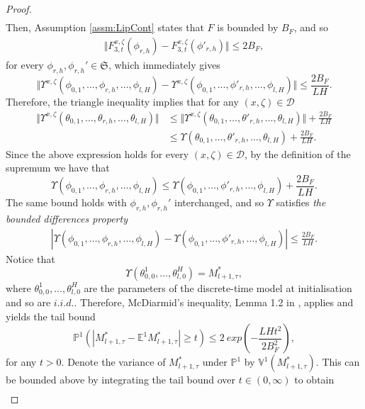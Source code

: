 \documentclass{article}
\begin{document}
\begin{appendices}
\begin{proof}
\begin{align*}
\end{align*}
 Then, Assumption \ref{assm:LipCont} states that $F$ is bounded by $B_F$, and so
\begin{align*}
     \Vert F_{3,t}^{x,\zeta}(\phi_{r,h})-F_{3,t}^{x,\zeta}(\phi'_{r,h}) \Vert\le 2B_F,
\end{align*}
 for every $\phi_{r,h},\phi_{r,h}'\in \mathfrak{S}$,
which immediately gives
\[
\Vert\Upsilon^{x,\zeta}(\phi_{0,1},\ldots,\phi_{r,h},\ldots, \phi_{l,H}) -\Upsilon^{x,\zeta}(\phi_{0,1},\ldots,\phi'_{r,h},\ldots, \phi_{l,H})\Vert \le \frac{2B_F}{LH}
.\]
Therefore, the triangle inequality implies that for any $(x,\zeta)\in \mathscr D$
\begin{align*}
    \Vert \Upsilon^{x,\zeta}(\theta_{0,1},\ldots,\theta_{r,h},\ldots, \theta_{l,H})\Vert &\le \Vert \Upsilon^{x,\zeta}(\theta_{0,1},\ldots,\theta'_{r,h},\ldots, \theta_{l,H})\Vert+ \frac{2B_F}{LH}\\
    &\le \Upsilon(\theta_{0,1},\ldots,\theta'_{r,h},\ldots, \theta_{l,H})+ \frac{2B_F}{LH}.
\end{align*}
 Since the above expression holds for every $(x,\zeta)\in \mathscr D$, by the definition of the supremum we have that
\[
\Upsilon(\phi_{0,1},\ldots,\phi_{r,h},\ldots, \phi_{l,H}) \le  \Upsilon(\phi_{0,1},\ldots,\phi'_{r,h},\ldots, \phi_{l,H})+ \frac{2B_F}{LH}.
\]
The same bound holds with $\phi_{r,h}, \phi_{r,h}'$ interchanged, and so $\Upsilon$ satisfies \textit{the bounded differences property}
\begin{align*}
    |\Upsilon( \phi_{0,1},\ldots ,\phi_{r,h},\ldots,\phi_{l,H})-  \Upsilon( \phi_{0,1},\ldots,\phi'_{r,h},\ldots,\phi_{l,H})| \le \frac{2B_F}{LH}.
\end{align*}
Notice that
\[
\Upsilon(\theta^1_{0,0}, \ldots , \theta^H_{l,0}) = M^*_{l+1,\tau},
\]
where $\theta^1_{0,0}, \ldots , \theta^H_{l,0}$ are the parameters of the discrete-time model at initialisation and so are $i.i.d.$.
Therefore, McDiarmid's inequality, Lemma 1.2 in \cite{McDiarmid_1989} , applies
and yields the tail bound
\begin{equation}\label{eqn:tailbound}
   \mathbb P^1\left( \left|M^*_{l+1,\tau}-\mathbb E^1 M_{l+1,\tau}^*\right|\ge t \right)\le 2\ exp\left(-\frac{LHt^2}{2B_F^2} \right),
\end{equation}
for any $t>0$. Denote the variance of $M^*_{l+1,\tau}$ under $\mathbb P^1$ by $\mathbb{V}^1(M^*_{l+1,\tau})$. This can be bounded above by integrating the tail bound over $t\in(0,\infty)$ to obtain
\begin{align}\label{eqn:Varbound}

\end{align}
\end{proof}
\end{appendices}
\end{document}
